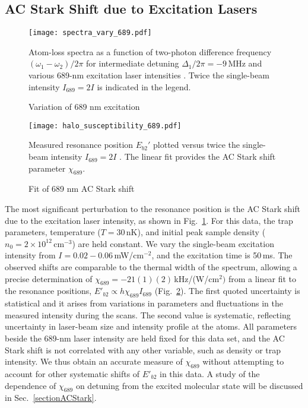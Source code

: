 \subsection{AC Stark Shift due to Excitation Lasers}

\begin{figure} \label{Fig:SpectraVarying689Intensity}
\centerline{
  \texttt{[image: spectra\_vary\_689.pdf]}}
  \caption{Variation of 689 nm excitation}{Atom-loss spectra as a function of two-photon difference frequency $(\omega_1-\omega_2)/2\pi$ for intermediate detuning $\Delta_1/2\pi=-9$\,MHz and various 689-nm excitation laser intensities . Twice the single-beam intensity $I_{689}=2I$ is indicated in the legend.}
 
\end{figure}

\begin{figure}
\centerline{
  \texttt{[image: halo\_susceptibility\_689.pdf]}}
  \caption{Fit of 689 nm AC Stark shift}{Measured resonance position $E_{b2}'$ plotted versus twice the single-beam intensity $I_{689}=2I$ . The linear fit provides the AC Stark shift parameter $\chi_{689}$.}
  \label{Fig:ShiftWith689Intensity}
\end{figure}

The most significant perturbation to the resonance position is the AC Stark shift due to the excitation laser intensity, as shown in Fig.\ \ref{Fig:SpectraVarying689Intensity}. For this data, the trap parameters, temperature ($T=30$\,nK), and initial peak sample density ($n_0=2\times 10^{12}$\,cm$^{-3}$) are held constant. We vary the single-beam excitation intensity from $I=0.02-0.06$\,mW/cm$^{-2}$, and the excitation time is 50\,ms.
The observed shifts are comparable to the thermal width of the spectrum, allowing a precise determination of $\chi_{689}=-21(1)(2)$\,kHz/(W/cm$^{2})$ from a linear fit to the resonance positions, $E'_{b2}\propto h\chi_{689} I_{689}$ (Fig.\ \ref{Fig:ShiftWith689Intensity}). The first quoted uncertainty is statistical and it arises from variations in parameters and fluctuations in the measured intensity during the scans. The second value is systematic, reflecting uncertainty in laser-beam size and intensity profile at the atoms. All parameters beside the 689-nm laser intensity are held fixed for this data set, and the AC Stark shift is not correlated with any other variable, such as density or trap intensity. We thus obtain an accurate measure of $\chi_{689}$ without attempting to account for other systematic shifts of $E'_{b2}$ in this data. A study of the dependence of $\chi_{689}$ on detuning from the excited molecular state
will be discussed in Sec.\ \ref{sectionACStark}.

